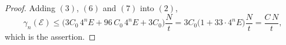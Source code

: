 \begin{proof}
Adding $(3)$, $(6)$ and $(7)$ into $(2)$,
\[
  \gamma_n(\mathcal{E})
    \leq \bigl(3C_0\,4^nE + 96\,C_0\,4^nE + 3C_0\bigr)\frac{N}{t}
    = 3C_0\bigl(1 + 33\cdot4^nE\bigr)\frac{N}{t}
    = \frac{C\,N}{t} ,
\]
which is the assertion.
%
\end{proof}

